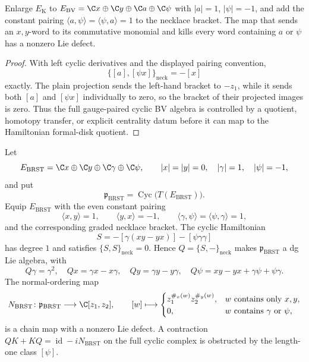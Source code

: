 \documentclass[11pt]{memoir}
\begin{document}
\begin{lem}
\label{lem:gauge-paired-necklace-plain-quotient-obstruction}
  Enlarge \(E_{\mathrm K}\) to
  \(E_{\mathrm{BV}}=\C x\oplus\C y\oplus\C a\oplus\C\psi\) with
  \(|a|=1\), \(|\psi|=-1\), and add the constant pairing
  \(\langle a,\psi\rangle=\langle\psi,a\rangle=1\) to the necklace bracket.
  The map that sends
  an \(x,y\)-word to its commutative monomial and kills every word
  containing \(a\) or \(\psi\) has a nonzero Lie defect.
\end{lem}

\begin{proof}
	  With left cyclic derivatives and the displayed pairing convention,
	  \[
	    \{[a],[\psi x]\}_{\mathrm{neck}}=-[x]
	  \]
	  exactly.  The plain
	  projection sends the left-hand bracket to \(-z_1\), while it sends both
  \([a]\) and \([\psi x]\) individually to zero, so the bracket of their
	  projected images is zero.  Thus the full gauge-paired cyclic BV algebra
	  is controlled by a quotient, homotopy transfer, or explicit
	  centrality datum before it can map to the Hamiltonian formal-disk
	  quotient.
\end{proof}

\begin{thm}
\label{thm:gauge-brst-cyclic-obstruction}
  Let
  \[
    E_{\mathrm{BRST}}
      =\C x\oplus\C y\oplus\C\gamma\oplus\C\psi,
      \qquad |x|=|y|=0,\quad |\gamma|=1,\quad |\psi|=-1,
  \]
  and put
  \[
    \mathfrak p_{\mathrm{BRST}}
      =\operatorname{Cyc}\bigl(T(E_{\mathrm{BRST}})\bigr).
  \]
  Equip \(E_{\mathrm{BRST}}\) with the even constant pairing
  \[
    \langle x,y\rangle=1,\qquad \langle y,x\rangle=-1,\qquad
    \langle\gamma,\psi\rangle=\langle\psi,\gamma\rangle=1,
  \]
  and the corresponding graded necklace bracket.  The cyclic Hamiltonian
  \[
    S=-[\gamma(xy-yx)]-[\psi\gamma\gamma]
  \]
  has degree \(1\) and satisfies \(\{S,S\}_{\mathrm{neck}}=0\).  Hence
  \(Q=\{S,-\}_{\mathrm{neck}}\) makes
  \(\mathfrak p_{\mathrm{BRST}}\) a dg Lie algebra, with
  \[
    Q\gamma=\gamma^2,\quad Qx=\gamma x-x\gamma,\quad
    Qy=\gamma y-y\gamma,\quad
    Q\psi=xy-yx+\gamma\psi+\psi\gamma .
  \]
  The normal-ordering map
  \[
    N_{\mathrm{BRST}}\colon\mathfrak p_{\mathrm{BRST}}\longrightarrow
    \C[z_1,z_2],
    \qquad
    [w]\longmapsto
    \begin{cases}
      z_1^{\#_x(w)}z_2^{\#_y(w)},&w\text{ contains only }x,y,\\
      0,&w\text{ contains }\gamma\text{ or }\psi,
    \end{cases}
  \]
  is a chain map with a nonzero Lie defect.  A contraction
  \(QK+KQ=\operatorname{id}-iN_{\mathrm{BRST}}\) on the full cyclic
  complex is obstructed by the length-one class \([\psi]\).
\end{thm}
\end{document}
